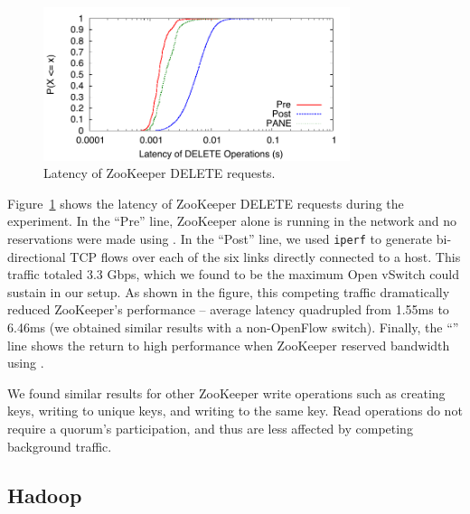 \begin{figure}[t]
\centering
\includegraphics[width=0.8\textwidth]{figs/DELETE-zk-latencies-logscale}
\caption{Latency of ZooKeeper DELETE requests.}
\label{fig:ZooKeeperDELETE}
\end{figure}

Figure~\ref{fig:ZooKeeperDELETE} shows the latency of ZooKeeper DELETE requests 
during the experiment. In the ``Pre'' line, ZooKeeper alone is running in the 
network and no reservations were made using \sys. In the ``Post'' line, we used 
\verb/iperf/ to generate bi-directional TCP flows over each of the six links 
directly connected to a host.
This traffic totaled 3.3 Gbps, which we found to 
be the maximum Open vSwitch could sustain in our setup.
As shown in the 
figure, this competing traffic dramatically reduced ZooKeeper's performance -- 
average latency quadrupled from 1.55ms to 6.46ms (we obtained
similar results with a non-OpenFlow switch). Finally, the ``\sys'' line shows 
the return to high performance when ZooKeeper reserved bandwidth using \sys.

We found similar results for other ZooKeeper write operations such as creating 
keys, writing to unique keys, and writing to the same key. Read operations do 
not require a quorum's participation, and thus are less affected by competing background 
traffic.

\subsection{Hadoop}

